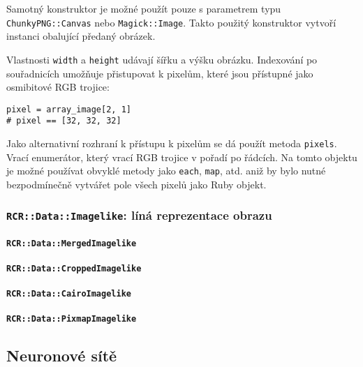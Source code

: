 \documentclass[a4paper]{article}
\begin{document}
Samotný konstruktor je možné použít pouze s parametrem typu
\texttt{ChunkyPNG::Canvas} nebo \texttt{Magick::Image}. Takto použitý
konstruktor vytvoří instanci obalující předaný obrázek.

Vlastnosti \texttt{width} a \texttt{height} udávají šířku a výšku obrázku.
Indexování po souřadnicích umožňuje přistupovat k pixelům, které jsou přístupné
jako osmibitové RGB trojice:
\begin{lstlisting}
pixel = array_image[2, 1]
# pixel == [32, 32, 32]
\end{lstlisting}

Jako alternativní rozhraní k přístupu k pixelům se dá použít metoda
\texttt{pixels}. Vrací enumerátor, který vrací RGB trojice v pořadí
po řádcích. Na tomto objektu je možné používat obvyklé metody jako
\texttt{each}, \texttt{map}, atd. aniž by bylo nutné bezpodmínečně
vytvářet pole všech pixelů jako Ruby objekt.


\subsubsection{\texttt{RCR::Data::Imagelike}: líná reprezentace obrazu}

\paragraph{\texttt{RCR::Data::MergedImagelike}}
\paragraph{\texttt{RCR::Data::CroppedImagelike}}
\paragraph{\texttt{RCR::Data::CairoImagelike}}
\paragraph{\texttt{RCR::Data::PixmapImagelike}}

\subsection{Neuronové sítě}
\end{document}
